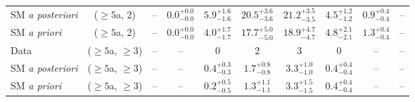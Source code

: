 \begin{table}[h!]
{\begin{tabular}{lccccccccc}
	SM {\it a posteriori} & ($\ge5$a, 2)      & --                             & $0.0^{+ 0.0 }_{- 0.0 }$        & $5.9^{+ 1.6 }_{- 1.6 }$     & $20.5^{+ 3.6 }_{- 3.6 }$    & $21.2^{+ 3.5 }_{- 3.5 }$    & $4.5^{+ 1.2 }_{- 1.2 }$  & $0.9^{+ 0.4 }_{- 0.4 }$  & --           \\[0.5ex] 
	SM {\it a priori}     & ($\ge5$a, 2)      & --                             & $0.0^{+ 0.0 }_{- 0.0 }$        & $4.0^{+ 1.7 }_{- 1.7 }$     & $17.7^{+ 5.0 }_{- 5.0 }$    & $18.9^{+ 4.7 }_{- 4.7 }$    & $4.8^{+ 2.1 }_{- 2.1 }$  & $1.3^{+ 0.4 }_{- 0.4 }$  & --           \\[0.5ex] 
	Data                  & ($\ge5$a, $\ge3$) & --                             & --                             & 0                           & 2                           & 3                           & 0                        & --                       & --           \\[0.5ex] 
	SM {\it a posteriori} & ($\ge5$a, $\ge3$) & --                             & --                             & $0.4^{+ 0.3 }_{- 0.3 }$     & $1.7^{+ 0.8 }_{- 0.8 }$     & $3.3^{+ 1.0 }_{- 1.0 }$     & $0.4^{+ 0.4 }_{- 0.4 }$  & --                       & --           \\[0.5ex] 
	SM {\it a priori}     & ($\ge5$a, $\ge3$) & --                             & --                             & $0.2^{+ 0.5 }_{- 0.5 }$     & $1.3^{+ 1.1 }_{- 1.1 }$     & $3.3^{+ 1.5 }_{- 1.5 }$     & $0.4^{+ 0.4 }_{- 0.4 }$  & --                       & --           \\[0.5ex] 
	\hline
	\hline
\end{tabular}}
\end{table}

